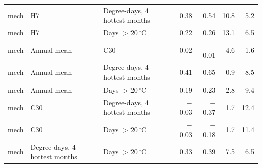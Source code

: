 \begin{table}
{\begin{tabular}{lllrrrr}
mech & H7 & Degree-days, 4 hottest months & 0.38 & 0.54 & 10.8 & 5.2 \\
mech & H7 & Days $>$20\,$^{\circ}$C & 0.22 & 0.26 & 13.1 & 6.5 \\
mech & Annual mean & C30 & 0.02 & \ensuremath{-}0.01 & 4.6 & 1.6 \\
mech & Annual mean & Degree-days, 4 hottest months & 0.41 & 0.65 & 0.9 & 8.5 \\
mech & Annual mean & Days $>$20\,$^{\circ}$C & 0.19 & 0.23 & 2.8 & 9.4 \\
mech & C30 & Degree-days, 4 hottest months & \ensuremath{-}0.03 & \ensuremath{-}0.37 & 1.7 & 12.4 \\
mech & C30 & Days $>$20\,$^{\circ}$C & \ensuremath{-}0.03 & \ensuremath{-}0.18 & 1.7 & 11.4 \\
mech & Degree-days, 4 hottest months & Days $>$20\,$^{\circ}$C & 0.33 & 0.39 & 7.5 & 6.5 \\
\bottomrule
\end{tabular}
}
\end{table}

